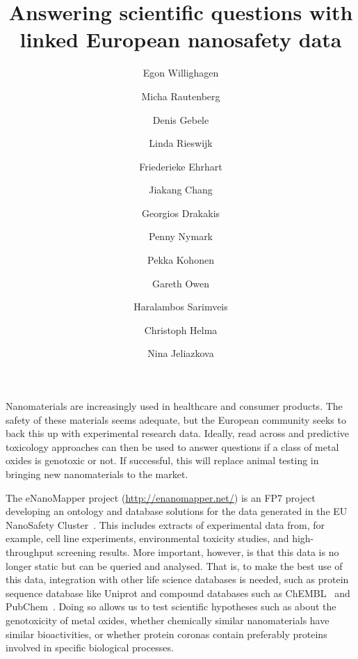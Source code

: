\documentclass{llncs}
\begin{document}
\title{Answering scientific questions with linked European nanosafety data}

\author{
  Egon Willighagen \and
  Micha Rautenberg \and
  Denis Gebele \and
  Linda Rieswijk \and
  Friederieke Ehrhart \and
  Jiakang Chang \and
  Georgios Drakakis \and
  Penny Nymark \and
  Pekka Kohonen \and
  Gareth Owen \and
  Haralambos Sarimveis \and
  Christoph Helma \and
  Nina Jeliazkova
}


\maketitle

Nanomaterials are increasingly used in healthcare and consumer products. The 
safety of these materials seems adequate, but the European community seeks to 
back this up with experimental research data. Ideally, read across and 
predictive toxicology approaches can then be used to answer questions if a class 
of metal oxides is genotoxic or not. If successful, this will replace animal 
testing in bringing new nanomaterials to the market.

The eNanoMapper project (\url{http://enanomapper.net/}) is an FP7 project developing
an ontology and database  solutions for the data generated in the EU NanoSafety
Cluster~\cite{Hastings2015,Jeliazkova2015}. This
includes extracts of experimental data from, for example, cell line experiments, 
environmental toxicity studies, and high-throughput screening results. More 
important, however, is that this data is no longer static but can be queried and 
analysed. That is, to make the best use of this data, integration with other 
life science databases is needed, such as protein sequence database like Uniprot 
and compound databases such as ChEMBL~\cite{Willighagen2013} and
PubChem~\cite{Fu2015}. Doing so allows us to 
test scientific hypotheses such as about the genotoxicity of metal oxides, 
whether chemically similar nanomaterials have similar bioactivities, or whether 
protein coronas contain preferably proteins involved in specific biological 
processes.
\end{document}
